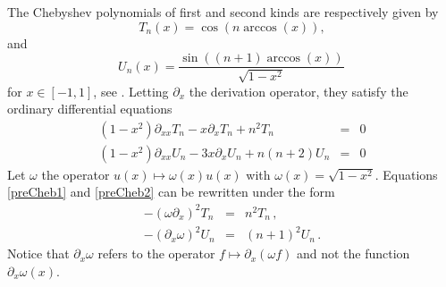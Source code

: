 \documentclass[a4paper]{article}
\begin{document}
The Chebyshev polynomials of first and second kinds are respectively given by
\[T_n(x) = \cos(n \arccos(x)),\]
and 
\[U_n(x) = \dfrac{\sin((n+1) \arccos(x))}{\sqrt{1 - x^2}}\,\]
for $x \in [-1,1]$, see \cite{mason2002chebyshev}. Letting $\partial_x$ the derivation operator, they satisfy
the ordinary differential equations
\begin{eqnarray}
	(1-x^2)\partial_{xx}T_n -x\partial_x T_n +n^2T_n &=& 0\label{preCheb1} \\ 
	(1-x^2)\partial_{xx}U_n -3x\partial_{x}U_n +n(n+2)U_n &=&0 \label{preCheb2}
\end{eqnarray}
Let $\omega$ the operator $u(x) \mapsto \omega(x)u(x)$ with $\omega(x) = \sqrt{1 - x^2}$. Equations \eqref{preCheb1} and \eqref{preCheb2} can be rewritten under the form
\begin{eqnarray}
	-(\omega\partial_x)^2 T_n &=& n^2T_n\,, \label{cheb1}\\
	-(\partial_x\omega)^2 U_n &=& (n+1)^2U_n\, .\label{cheb2}
\end{eqnarray}
Notice that $\partial_x\omega$ refers to the operator $f \mapsto \partial_x(\omega f)$ and not the function $\partial_x\omega(x)$. 
\end{document}
